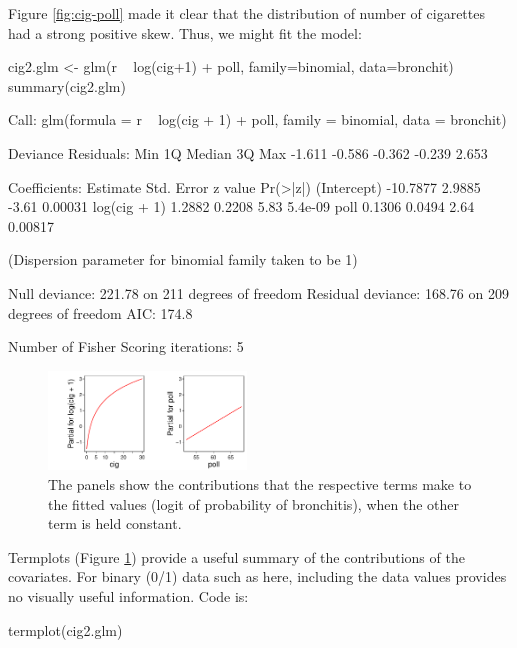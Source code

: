 \documentclass{tufte-book}\usepackage[]{graphicx}\usepackage[]{color}
\begin{document}
Figure \ref{fig:cig-poll} made it clear
that the distribution of number of cigarettes had a strong positive
skew.  Thus, we might fit the model:
\begin{fullwidth}
\begin{Schunk}
\begin{Sinput}
cig2.glm <- glm(r ~ log(cig+1) + poll, family=binomial, data=bronchit)
summary(cig2.glm)
\end{Sinput}
\begin{Soutput}

Call:
glm(formula = r ~ log(cig + 1) + poll, family = binomial, data = bronchit)

Deviance Residuals: 
   Min      1Q  Median      3Q     Max  
-1.611  -0.586  -0.362  -0.239   2.653  

Coefficients:
             Estimate Std. Error z value Pr(>|z|)
(Intercept)  -10.7877     2.9885   -3.61  0.00031
log(cig + 1)   1.2882     0.2208    5.83  5.4e-09
poll           0.1306     0.0494    2.64  0.00817

(Dispersion parameter for binomial family taken to be 1)

    Null deviance: 221.78  on 211  degrees of freedom
Residual deviance: 168.76  on 209  degrees of freedom
AIC: 174.8

Number of Fisher Scoring iterations: 5
\end{Soutput}
\end{Schunk}
\end{fullwidth}

\begin{figure}[h]
\begin{Schunk}


\centerline{\includegraphics[width=0.47\textwidth]{figs/11-cig2-tplot-1} }

\end{Schunk}
\caption{The panels show the contributions that the respective terms
  make to the fitted values (logit of probability of bronchitis), when
  the other term is held constant.\label{fig:xy-cig}}
\end{figure}

Termplots (Figure \ref{fig:xy-cig}) provide a useful summary of the
contributions of the covariates.  For binary (0/1) data such as here,
including the data values provides no visually useful information.
Code is:
\begin{Schunk}
\begin{Sinput}
termplot(cig2.glm)
\end{Sinput}
\end{Schunk}
\end{document}
